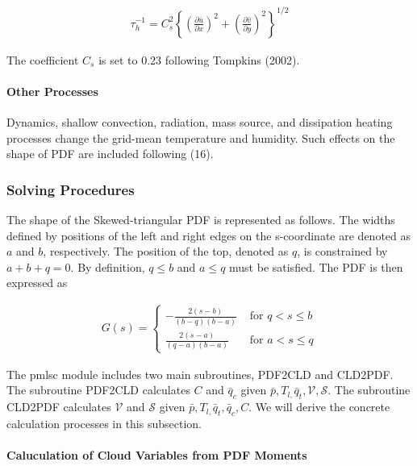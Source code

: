 \begin{eqnarray}
\tau_{h}^{-1}=C_{s}^{2}\left\{\left(\frac{\partial \bar{u}}{\partial x}\right)^{2}+\left(\frac{\partial \bar{v}}{\partial y}\right)^{2}\right\}^{1 / 2}
\end{eqnarray}

The coefficient \(C_{s}\) is set to 0.23 following Tompkins (2002).

\hypertarget{other-processes}{%
\paragraph{Other Processes}\label{other-processes}}

Dynamics, shallow convection, radiation, mass source, and dissipation heating processes change the grid-mean temperature and humidity. Such effects on the shape of PDF are included following (16).

\hypertarget{solving-procedures}{%
\subsubsection{Solving Procedures}\label{solving-procedures}}

The shape of the Skewed-triangular PDF is represented as follows. The widths defined by positions of the left and right edges on the s-coordinate are denoted as \(a\) and \(b\), respectively. The
position of the top, denoted as \(q\), is constrained by \(a+b+q=0\). By definition, \(q \leq b\) and \(a \leq q\) must be satisfied. The PDF is then expressed as

\begin{eqnarray}
G(s)=\left\{\begin{array}{cl}-\frac{2(s-b)}{(b-q)(b-a)} & \text { for } q<s \leq b \\ \frac{2(s-a)}{(q-a)(b-a)} & \text { for } a<s \leq q\end{array}\right.
\end{eqnarray}

The pmlsc module includes two main subroutines, PDF2CLD and CLD2PDF. The subroutine PDF2CLD calculates \(C\) and \(\bar{q}_{c}\) given \(\bar{p}, T_{l,} \bar{q}_{t}, \mathcal{V}, \mathcal{S}\). The
subroutine CLD2PDF calculates \(\mathcal{V}\) and \(\mathcal{S}\) given \(\bar{p}, T_{l,} \bar{q}_{t}, \bar{q}_{c}, C\). We will derive the concrete calculation processes in this subsection.

\hypertarget{caluculation-of-cloud-variables-from-pdf-moments}{%
\paragraph{Caluculation of Cloud Variables from PDF Moments}\label{caluculation-of-cloud-variables-from-pdf-moments}}

